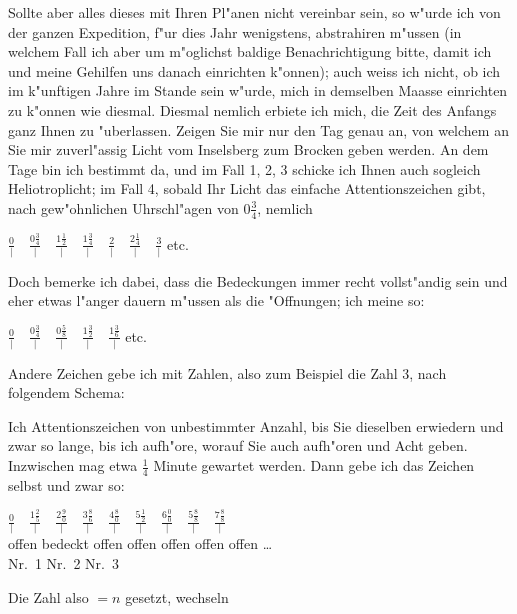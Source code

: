 \documentclass[12pt,a4paper]{article}
\theoremstyle{plain}
\theoremstyle{definition}
\theoremstyle{remark}
\begin{document}
\newpage
\noindent Sollte aber alles dieses mit Ihren Pl"anen nicht vereinbar sein, so w"urde ich von der ganzen Expedition, f"ur dies Jahr wenigstens, abstrahiren m"ussen (in welchem Fall ich aber um m"oglichst baldige Benachrichtigung bitte, damit ich und meine Gehilfen uns danach einrichten k"onnen); auch weiss ich nicht, ob ich im k"unftigen Jahre im Stande sein w"urde, mich in demselben Maasse einrichten zu k"onnen wie diesmal. Diesmal nemlich erbiete ich mich, die Zeit des Anfangs ganz Ihnen zu "uberlassen. Zeigen Sie mir nur den Tag genau an, von welchem an Sie mir zuverl"assig Licht vom Inselsberg zum Brocken geben werden. An dem Tage bin ich bestimmt da, und im Fall 1, 2, 3 schicke ich Ihnen auch sogleich Heliotroplicht; im Fall 4, sobald Ihr Licht das einfache Attentionszeichen gibt, nach gew"ohnlichen Uhrschl"agen von $0\frac{3}{4}$, nemlich
\begin{center}
$\displaystyle \frac{0}{|} \quad \frac{0\frac{3}{4}}{|} \quad \frac{1\frac{1}{2}}{|} \quad \frac{1\frac{3}{4}}{|} \quad \frac{2}{|} \quad \frac{2\frac{1}{4}}{|} \quad \frac{3}{|}$ etc.
\end{center}
Doch bemerke ich dabei, dass die Bedeckungen immer recht vollst"andig sein und eher etwas l"anger dauern m"ussen als die "Offnungen; ich meine so:
\begin{center}
$\displaystyle \frac{0}{|} \quad \frac{0\frac{3}{4}}{|} \quad \frac{0\frac{5}{8}}{|} \quad \frac{1\frac{3}{2}}{|} \quad \frac{1\frac{3}{6}}{|}$ etc.
\end{center}
Andere Zeichen gebe ich mit Zahlen, also zum Beispiel die Zahl 3, nach folgendem Schema:

Ich Attentionszeichen von unbestimmter Anzahl, bis Sie dieselben erwiedern und zwar so lange, bis ich aufh"ore, worauf Sie auch aufh"oren und Acht geben. Inzwischen mag etwa $\frac{1}{4}$ Minute gewartet werden. Dann gebe ich das Zeichen selbst und zwar so:
\begin{center}
$\displaystyle \frac{0}{|} \quad \frac{1\frac{2}{5}}{|} \quad \frac{2\frac{9}{0}}{|} \quad \frac{3\frac{8}{6}}{|} \quad \frac{4\frac{8}{0}}{|} \quad \frac{5\frac{1}{2}}{|} \quad \frac{6\frac{0}{0}}{|} \quad \frac{5\frac{8}{8}}{|} \quad \frac{7\frac{8}{8}}{|}$ \\
offen \quad bedeckt \quad offen \quad offen \quad offen \quad offen \quad offen \quad\ldots \\
Nr.~1 \quad\quad Nr.~2 \quad\quad\quad Nr.~3
\end{center}
Die Zahl also $= n$ gesetzt, wechseln
\end{document}
